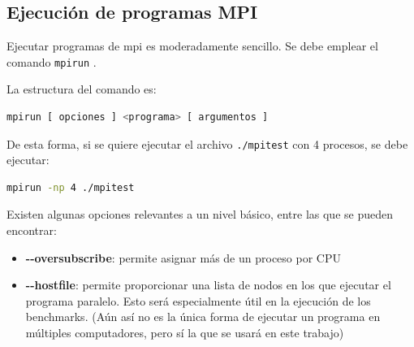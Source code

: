 \subsection{Ejecución de programas MPI}
\label{sssec:ejecucion_mpi}
Ejecutar programas de \acrshort{mpi} es moderadamente sencillo. Se debe emplear el comando \texttt{mpirun} \cite{mpi_mpirun}.

La estructura del comando es:
\begin{lstlisting}[language=bash]
mpirun [ opciones ] <programa> [ argumentos ]
\end{lstlisting}

De esta forma, si se quiere ejecutar el archivo \texttt{./mpitest} con 4 procesos, se debe ejecutar:
\begin{lstlisting}[language=bash]
mpirun -np 4 ./mpitest
\end{lstlisting}


Existen algunas opciones relevantes a un nivel básico, entre las que se pueden encontrar:
\begin{itemize}
  \item\textbf{-{}-oversubscribe}: permite asignar más de un proceso por CPU
  \item\textbf{-{}-hostfile}: permite proporcionar una lista de nodos en los que ejecutar el programa paralelo. Esto será especialmente útil en la ejecución de los benchmarks. (Aún así no es la única forma de ejecutar un programa en múltiples computadores, pero sí la que se usará en este trabajo) 
\end{itemize}

